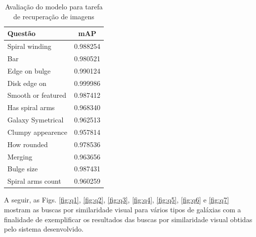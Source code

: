 \begin{table}[!ht]
  \centering
  \caption{Avaliação do modelo para tarefa de recuperação de imagens}
  \label{tab:test-map}
  \begin{tabular}{lc}
    \toprule
    Questão            & mAP      \\
    \midrule
    Spiral winding     & 0.988254 \\
    Bar                & 0.980521 \\
    Edge on bulge      & 0.990124 \\
    Disk edge on       & 0.999986 \\
    Smooth or featured & 0.987412 \\
    Has spiral arms    & 0.968340 \\
    Galaxy Symetrical  & 0.962513 \\
    Clumpy appearence  & 0.957814 \\
    How rounded        & 0.978536 \\
    Merging            & 0.963656 \\
    Bulge size         & 0.987431 \\
    Spiral arms count  & 0.960259 \\
    \bottomrule
  \end{tabular}
\end{table}


A seguir, as Figs. \ref{fig:q1}, \ref{fig:q2}, \ref{fig:q3}, \ref{fig:q4}, \ref{fig:q5}, \ref{fig:q6} e \ref{fig:q7} mostram as buscas por similaridade visual para vários tipos de galáxias com a finalidade de exemplificar os resultados das buscas por similaridade visual obtidas pelo sistema desenvolvido.


